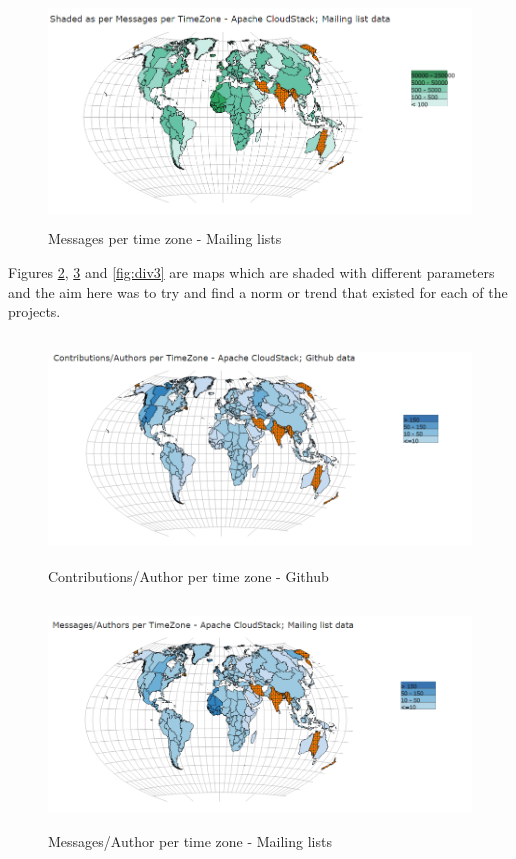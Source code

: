 \documentclass[double,12pt]{beavtex}
\begin{document}
\begin{figure}[H]
\centering
\includegraphics[width=130mm,height=60mm]{image7.PNG}
\caption{Messages per time zone - Mailing lists}
\label{fig:mgML}
\end{figure}

Figures \ref{fig:div1}, \ref{fig:div2} and \ref{fig:div3} are maps which are shaded with different parameters and the aim here was to try and find a norm or trend that existed for each of the projects.

\begin{figure}[H]
\centering
\includegraphics[width=130mm,height=60mm]{image8.PNG}
\caption{Contributions/Author per time zone - Github}
\label{fig:div1}
\end{figure}

\begin{figure}[H]
\centering
\includegraphics[width=130mm,height=60mm]{image9.PNG}
\caption{Messages/Author per time zone - Mailing lists}
\label{fig:div2}
\end{figure}
\end{document}
